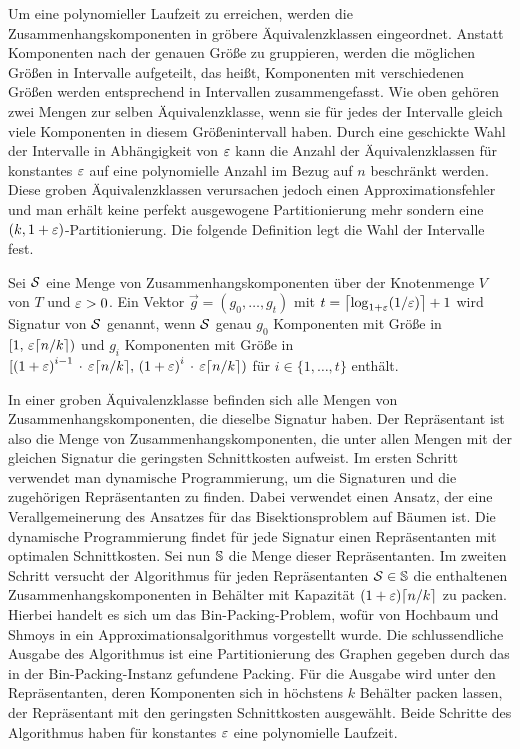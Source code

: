 Um eine polynomieller Laufzeit zu erreichen, werden die Zusammenhangskomponenten in gröbere Äquivalenzklassen eingeordnet.
Anstatt Komponenten nach der genauen Größe zu gruppieren, werden die möglichen Größen in Intervalle aufgeteilt, das heißt, Komponenten mit verschiedenen Größen werden entsprechend in Intervallen zusammengefasst. 
Wie oben gehören zwei Mengen zur selben Äquivalenzklasse, wenn sie für jedes der Intervalle gleich viele Komponenten in diesem Größenintervall haben.
Durch eine geschickte Wahl der Intervalle in Abhängigkeit von $\eps$ kann die Anzahl der Äquivalenzklassen für konstantes $\eps$ auf eine polynomielle Anzahl im Bezug auf $n$ beschränkt werden.
Diese groben Äquivalenzklassen verursachen jedoch einen Approximationsfehler und man erhält keine perfekt ausgewogene Partitionierung mehr sondern eine $(k, 1+\eps)$\hyp Partitionierung. Die folgende Definition legt die Wahl der Intervalle fest.

\begin{defn}[Signatur]\label{defn:signature}
    Sei $\calS$ eine Menge von Zusammenhangskomponenten über der Knotenmenge $V$ von $T$ und $\eps > 0$. Ein Vektor $\vec{g} = (g_0, \ldots, g_t)$ mit $t = \ceil*{\log_{1+\eps}(1/\eps)} + 1$ wird Signatur von $\calS$ genannt, wenn $\calS$ genau $g_0$ Komponenten mit Größe in $[1,\, \eps \ceil*{n/k})$ und $g_i$ Komponenten mit Größe in $[{(1+\eps)}^{i-1}\, \cdot\, \eps \ceil*{n/k},\, {(1+\eps)}^i\, \cdot \, \eps \ceil*{n/k})$ für $i \in \{1, \ldots, t\}$ enthält.
\end{defn}

In einer groben Äquivalenzklasse befinden sich alle Mengen von Zusammenhangskomponenten, die dieselbe Signatur haben.
Der Repräsentant ist also die Menge von Zusammenhangskomponenten, die unter allen Mengen mit der gleichen Signatur die geringsten Schnittkosten aufweist.
Im ersten Schritt verwendet man dynamische Programmierung, um die Signaturen und die zugehörigen Repräsentanten zu finden.
Dabei verwendet einen Ansatz, der eine Verallgemeinerung des Ansatzes für das Bisektionsproblem auf Bäumen ist. \parencite{mcg78, ws11}
Die dynamische Programmierung findet für jede Signatur einen Repräsentanten mit optimalen Schnittkosten.
Sei nun $\bbS$ die Menge dieser Repräsentanten.
Im zweiten Schritt versucht der Algorithmus für jeden Repräsentanten $\calS \in \bbS$ die enthaltenen Zusammenhangskomponenten in Behälter mit Kapazität $(1+\eps)\ceil*{n/k}$ zu packen. 
Hierbei handelt es sich um das Bin-Packing-Problem, wofür von Hochbaum und Shmoys in \parencite{hs86} ein Approximationsalgorithmus vorgestellt wurde.
Die schlussendliche Ausgabe des Algorithmus ist eine Partitionierung des Graphen gegeben durch das in der Bin-Packing-Instanz gefundene Packing.
Für die Ausgabe wird unter den Repräsentanten, deren Komponenten sich in höchstens $k$ Behälter packen lassen, der Repräsentant mit den geringsten Schnittkosten ausgewählt.
Beide Schritte des Algorithmus haben für konstantes $\eps$ eine polynomielle Laufzeit.

